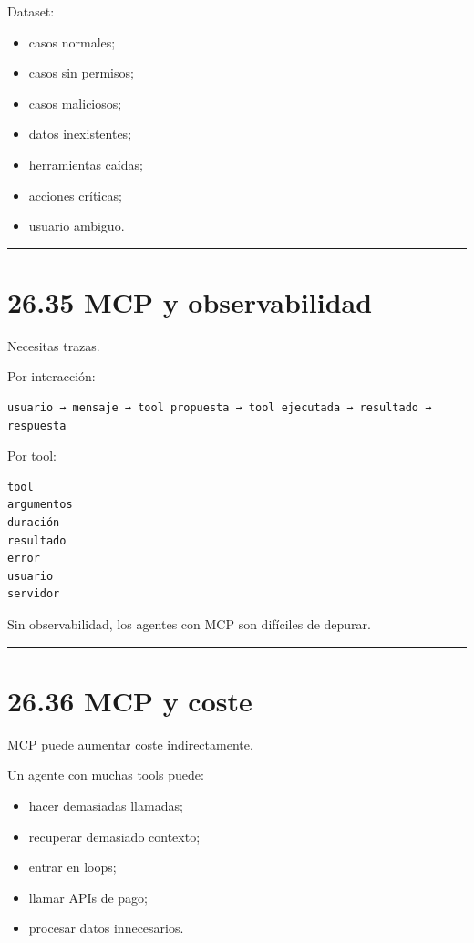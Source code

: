 Dataset:

\begin{itemize}
\tightlist
\item
  casos normales;
\item
  casos sin permisos;
\item
  casos maliciosos;
\item
  datos inexistentes;
\item
  herramientas caídas;
\item
  acciones críticas;
\item
  usuario ambiguo.
\end{itemize}

\begin{center}\rule{0.5\linewidth}{0.5pt}\end{center}

\section{26.35 MCP y observabilidad}\label{mcp-y-observabilidad}

Necesitas trazas.

Por interacción:

\begin{lstlisting}
usuario → mensaje → tool propuesta → tool ejecutada → resultado → respuesta
\end{lstlisting}

Por tool:

\begin{lstlisting}
tool
argumentos
duración
resultado
error
usuario
servidor
\end{lstlisting}

Sin observabilidad, los agentes con MCP son difíciles de depurar.

\begin{center}\rule{0.5\linewidth}{0.5pt}\end{center}

\section{26.36 MCP y coste}\label{mcp-y-coste}

MCP puede aumentar coste indirectamente.

Un agente con muchas tools puede:

\begin{itemize}
\tightlist
\item
  hacer demasiadas llamadas;
\item
  recuperar demasiado contexto;
\item
  entrar en loops;
\item
  llamar APIs de pago;
\item
  procesar datos innecesarios.
\end{itemize}

